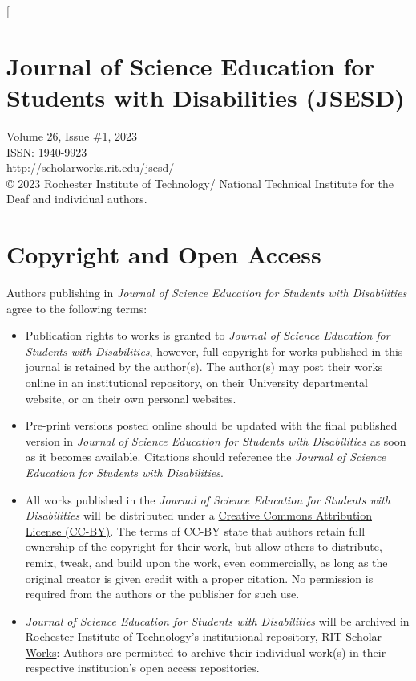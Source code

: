 \documentclass[11.5pt]{sig-alternate}
\begin{document}
\begin{large}
\twocolumn[
\begin{@twocolumnfalse}
 \section*{Journal of Science Education for Students with Disabilities (JSESD)}
 
Volume 26, Issue \#1, 2023\\ISSN: 1940-9923\\
\href{http://scholarworks.rit.edu/jsesd/}{http://scholarworks.rit.edu/jsesd/}\\
© 2023 Rochester Institute of Technology/ National Technical Institute for the Deaf and
individual authors.\\
 \section*{Copyright and Open Access}
Authors publishing in \textit{Journal of Science Education for Students with Disabilities} agree to the following terms:
\begin{itemize}
    \item 
Publication rights to works is granted to \textit{Journal of Science Education for Students with Disabilities}, however, full copyright for works published in this journal is retained by the author(s). The author(s) may post their works online in an institutional repository, on their University departmental website, or on their own personal websites.
 \item 
Pre-print versions posted online should be updated with the final published version in \textit{Journal of Science Education for Students with Disabilities} as soon as it becomes available. Citations should reference the \textit{Journal of Science Education for Students with Disabilities}.
 \item 
All works published in the \textit{Journal of Science Education for Students with Disabilities} will be distributed under a \href{http://creativecommons.org/licenses/by/3.0/}{Creative Commons Attribution License (CC-BY)}. The terms of CC-BY state that authors retain full ownership of the copyright for their work, but allow others to distribute, remix, tweak, and build upon the work, even commercially, as long as the original creator is given credit with a proper citation. No permission is required from the authors or the publisher for such use.
 \item 
\textit{Journal of Science Education for Students with Disabilities} will be archived in Rochester Institute of Technology's institutional repository, \href{https://scholarworks.rit.edu/}{RIT Scholar Works}: Authors are permitted to archive their individual work(s) in their respective institution's open access repositories.
\end{itemize}


\end{@twocolumnfalse}
\end{large}
\end{document}
